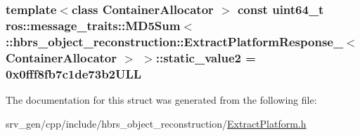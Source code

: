 \hypertarget{structros_1_1message__traits_1_1_m_d5_sum_3_01_1_1hbrs__object__reconstruction_1_1_extract_platfe02bd193932d0f6b32732e8a756f98f0_ade934384b47a5c8a4b99e780d22c311e}{
\subsubsection[{static\-\_\-value2}]{\setlength{\rightskip}{0pt plus 5cm}template$<$class Container\-Allocator $>$ const uint64\-\_\-t ros\-::message\-\_\-traits\-::\-M\-D5\-Sum$<$ \-::{\bf hbrs\-\_\-object\-\_\-reconstruction\-::\-Extract\-Platform\-Response\-\_\-}$<$ \-Container\-Allocator $>$ $>$\-::{\bf static\-\_\-value2} = 0x0fff8fb7c1de73b2\-U\-L\-L}}\label{structros_1_1message__traits_1_1_m_d5_sum_3_01_1_1hbrs__object__reconstruction_1_1_extract_platfe02bd193932d0f6b32732e8a756f98f0_ade934384b47a5c8a4b99e780d22c311e}


\-The documentation for this struct was generated from the following file\-:\begin{DoxyCompactItemize}
\item 
srv\-\_\-gen/cpp/include/hbrs\-\_\-object\-\_\-reconstruction/\hyperlink{_extract_platform_8h}{\-Extract\-Platform.\-h}\end{DoxyCompactItemize}
